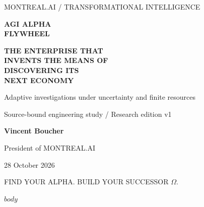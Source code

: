 \documentclass[10pt,letterpaper]{article}
\begin{document}
\begin{titlepage}
\thispagestyle{empty}
\color{purple}
{\sffamily\small MONTREAL.AI / TRANSFORMATIONAL INTELLIGENCE\par}
\vspace{1.15in}
{\sffamily\bfseries\fontsize{35}{40}\selectfont AGI ALPHA\\[.08in]FLYWHEEL\par}
\vspace{.35in}
{\sffamily\bfseries\fontsize{22}{28}\selectfont THE ENTERPRISE THAT\\INVENTS THE MEANS OF\\DISCOVERING ITS\\NEXT ECONOMY\par}
\vspace{.4in}
{\large Adaptive investigations under uncertainty and finite resources\par}
\vspace{.2in}
{\normalsize Source-bound engineering study / Research edition v1\par}
\vfill
{\large\bfseries Vincent Boucher\par}
{President of MONTREAL.AI\par}
\vspace{.2in}
{28 October 2026\par}
\vspace{.25in}
{\small\sffamily FIND YOUR ALPHA. BUILD YOUR SUCCESSOR \(\Omega\).\par}
\end{titlepage}
\setcounter{page}{1}
$body$
\end{document}
